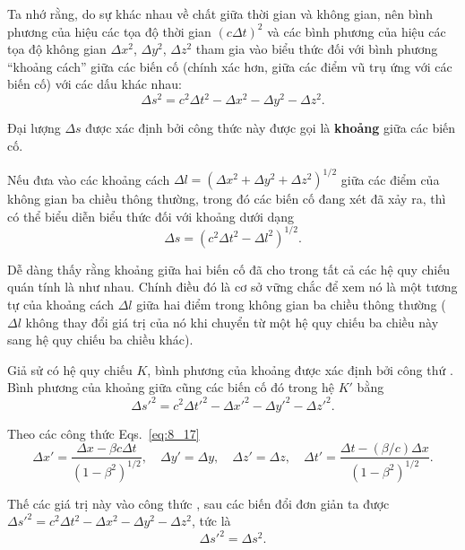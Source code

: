 Ta nhớ rằng, do sự khác nhau về chất giữa thời gian và không gian, nên bình phương của hiệu các tọa độ thời gian $(c\Delta t)^2$ và các bình phương của hiệu các tọa độ không gian $\Delta x^2$, $\Delta y^2$, $\Delta z^2$ tham gia vào biểu thức đối với bình phương ``khoảng cách'' giữa các biến cố (chính xác hơn, giữa các điểm vũ trụ ứng với các biến cố) với các dấu khác nhau:
\begin{equation}\label{eq:8_22}
	\Delta s^2 = c^2\Delta t^2 - \Delta x^2 - \Delta y^2 - \Delta z^2.
\end{equation}

\noindent
Đại lượng $\Delta s$ được xác định bởi công thức này được gọi là \textbf{khoảng} giữa các biến cố.

Nếu đưa vào các khoảng cách $\Delta l=\left(\Delta x^2+\Delta y^2+\Delta z^2\right)^{1/2}$ giữa các điểm của không gian ba chiều thông thường, trong đó các biến cố đang xét đã xảy ra, thì có thể biểu diễn biểu thức đối với khoảng dưới dạng
\begin{equation}\label{eq:8_23}
	\Delta s = \left(c^2\Delta t^2 - \Delta l^2\right)^{1/2}.
\end{equation}

Dễ dàng thấy rằng khoảng giữa hai biến cố đã cho trong tất cả các hệ quy chiếu quán tính là như nhau. Chính điều đó là cơ sở vững chắc để xem nó là một tương tự của khoảng cách $\Delta l$ giữa hai điểm trong không gian ba chiều thông thường ($\Delta l$ không thay đổi giá trị của nó khi chuyển từ một hệ quy chiếu ba chiều này sang hệ quy chiếu ba chiều khác).

Giả sử có hệ quy chiếu $K$, bình phương của khoảng được xác định bởi công thứ . Bình phương của khoảng giữa cũng các biến cố đó trong hệ $K'$ bằng
\begin{equation}\label{eq:8_24}
	\Delta s'^2 = c^2\Delta t'^2 - \Delta x'^2 - \Delta y'^2 - \Delta z'^2.
\end{equation}

\noindent
Theo các công thức Eqs.~\eqref{eq:8_17}
\begin{equation*}
	\Delta x' = \frac{\Delta x - \beta c\Delta t}{\left(1 - \beta^2\right)^{1/2}},\quad \Delta y' = \Delta y,\quad \Delta z' = \Delta z,\quad 	\Delta t' = \frac{\Delta t - (\beta/c)\Delta x}{\left(1 - \beta^2\right)^{1/2}}.
\end{equation*}

\noindent
Thế các giá trị này vào công thức , sau các biến đổi đơn giản ta được $\Delta s'^2 = c^2\Delta t^2 - \Delta x^2 - \Delta y^2 - \Delta z^2$, tức là
\begin{equation*}
	\Delta s'^2 = \Delta s^2.
\end{equation*}

